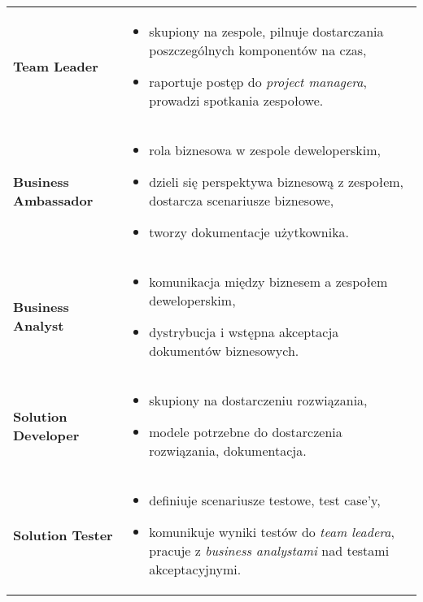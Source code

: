 \documentclass[../main.tex]{subfiles}
\begin{document}
\begin{table}[H]
\begin{center}
\begin{tabular}{ p{} p{} }
                \textbf{Team Leader}
                &
                \begin{itemize}
                    \item skupiony na zespole, pilnuje dostarczania poszczególnych komponentów na czas,
                    \item raportuje postęp do \textit{project managera}, prowadzi spotkania zespołowe.
                \end{itemize}
                \\

                \textbf{Business Ambassador}
                &
                \begin{itemize}
                    \item rola biznesowa w zespole deweloperskim,
                    \item dzieli się perspektywa biznesową z zespołem, dostarcza scenariusze biznesowe,
                    \item tworzy dokumentacje użytkownika.
                \end{itemize}
                \\

                \textbf{Business Analyst}
                &
                \begin{itemize}
                    \item komunikacja między biznesem a zespołem deweloperskim,
                    \item dystrybucja i wstępna akceptacja dokumentów biznesowych.
                \end{itemize}
                \\

                \textbf{Solution Developer}
                &
                \begin{itemize}
                    \item skupiony na dostarczeniu rozwiązania,
                    \item modele potrzebne do dostarczenia rozwiązania, dokumentacja.
                \end{itemize}
                \\

                \textbf{Solution Tester}
                &
                \begin{itemize}
                    \item definiuje scenariusze testowe, test case'y,
                    \item komunikuje wyniki testów do \textit{team leadera},
                    pracuje z \textit{business analystami} nad testami akceptacyjnymi.
                \end{itemize}
                \\

            \end{tabular}
        \end{center}
    \end{table}
\end{document}
